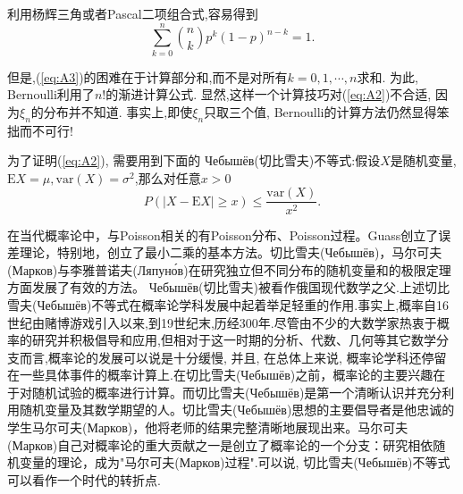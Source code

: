 利用杨辉三角或者Pascal二项组合式,容易得到\begin{equation}\label{eq:A4}
\sum_{k=0}^n\binom{n}{k}p^k(1-p)^{n-k} = 1.	
\end{equation}

但是,(\ref{eq:A3})的困难在于计算部分和,而不是对所有$k=0,1,\cdots,n$求和. 为此, Bernoulli利用了$n!$的渐进计算公式. 显然,这样一个计算技巧对(\ref{eq:A2})不合适, 因为$\xi_n$的分布并不知道. 事实上,即使$\xi_n$只取三个值, Bernoulli的计算方法仍然显得笨拙而不可行!

为了证明(\ref{eq:A2}), 需要用到下面的 Чебышёв(切比雪夫)不等式:假设$X$是随机变量, $\mathrm{E}X = \mu,\mathrm{var}(X) = \sigma^2$,那么对任意$x>0$
\begin{equation}\label{eq:A5}
P(|X-\mathrm{E}X|\geqslant x)\leqslant \frac{\mathrm{var}(X)}{x^2}.
\end{equation}

在当代概率论中，与Poisson相关的有Poisson分布、Poisson过程。Guass创立了误差理论，特别地，创立了最小二乘的基本方法。切比雪夫(Чебышёв)，马尔可夫(Марков)与李雅普诺夫(Ляпуно́в)在研究独立但不同分布的随机变量和的极限定理方面发展了有效的方法。
Чебышёв(切比雪夫)被看作俄国现代数学之父.上述切比雪夫(Чебышёв)不等式在概率论学科发展中起着举足轻重的作用.事实上,概率自16世纪由赌博游戏引入以来,到19世纪末,历经300年.尽管由不少的大数学家热衷于概率的研究并积极倡导和应用,但相对于这一时期的分析、代数、几何等其它数学分支而言,概率论的发展可以说是十分缓慢, 并且, 在总体上来说, 概率论学科还停留在一些具体事件的概率计算上.在切比雪夫(Чебышёв)之前，概率论的主要兴趣在于对随机试验的概率进行计算。而切比雪夫(Чебышёв)是第一个清晰认识并充分利用随机变量及其数学期望的人。切比雪夫(Чебышёв)思想的主要倡导者是他忠诚的学生马尔可夫(Марков)，他将老师的结果完整清晰地展现出来。马尔可夫(Марков)自己对概率论的重大贡献之一是创立了概率论的一个分支：研究相依随机变量的理论，成为"马尔可夫(Марков)过程".可以说, 切比雪夫(Чебышёв)不等式可以看作一个时代的转折点.


